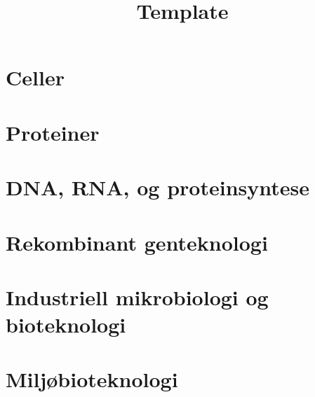 

\title{Template}





    

    \section{Celler}
    

    \section{Proteiner}
    

    \section{DNA, RNA, og proteinsyntese}
    

    \section{Rekombinant genteknologi}
    

    \section{Industriell mikrobiologi og bioteknologi}
    

    \section{Miljøbioteknologi}
    


